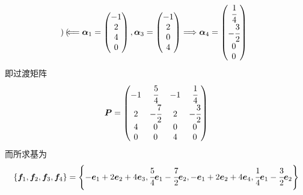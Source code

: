 {\begin{solution}
\[\begin{pmatrix}
            \end{pmatrix}\Longleftarrow
            \bm{\alpha}_1=\begin{pmatrix}
                -1 \\2\\4\\0
            \end{pmatrix},\bm{\alpha}_3=\begin{pmatrix}
                -1 \\2\\0\\4
            \end{pmatrix}\Longrightarrow\bm{\alpha}_4=\begin{pmatrix}
                \cfrac{1}{4} \\-\cfrac{3}{2}\\0\\0
            \end{pmatrix}
        \]
        即过渡矩阵\[
            \bm{P}=\begin{pmatrix}
                -1 & \cfrac{5}{4}  & -1 & \cfrac{1}{4}  \\
                2  & -\cfrac{7}{2} & 2  & -\cfrac{3}{2} \\
                4  & 0             & 0  & 0             \\
                0  & 0             & 4  & 0
            \end{pmatrix}
        \]而所求基为\[
            \left\{
            \bm{f}_1,\bm{f}_2,\bm{f}_3,\bm{f}_4
            \right\}=\left\{
            -\bm{e}_1+2\bm{e}_2+4\bm{e}_3,\cfrac{5}{4}\bm{e}_1-\cfrac{7}{2}\bm{e}_2,-\bm{e}_1+2\bm{e}_2+4\bm{e}_4,\cfrac{1}{4}\bm{e}_1-\cfrac{3}{2}\bm{e}_2
            \right\}
        \]
    \end{solution}
}
